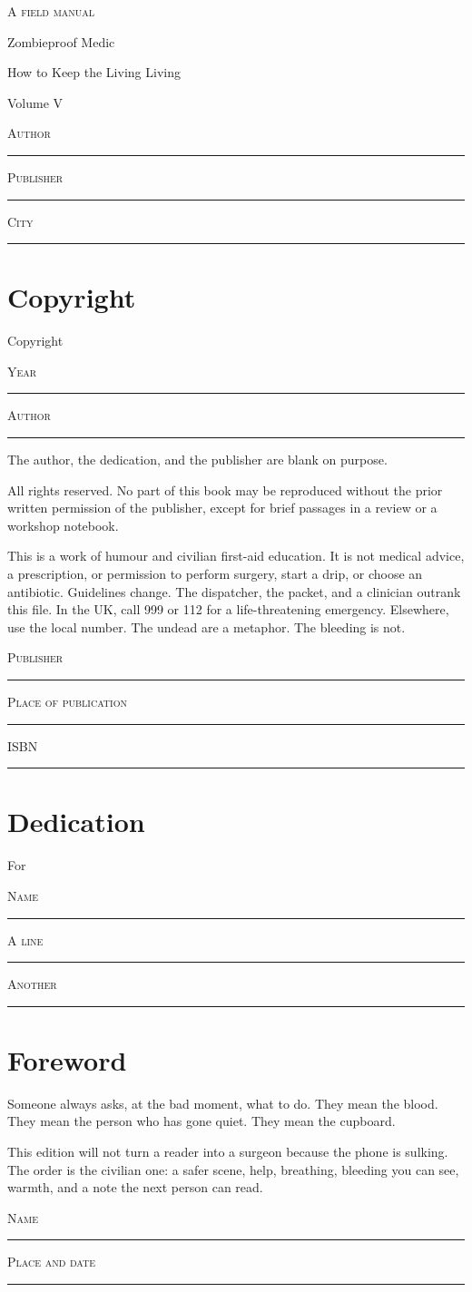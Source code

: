 \documentclass[10pt,openright]{book}
\newcommand{\blankline}[1]{%
  \par\medskip
  {\small\scshape #1}\par\noindent
  \rule{0.8\textwidth}{0.4pt}\par\smallskip
}
\begin{document}
\frontmatter
\begin{titlepage}
\begin{center}
{\small\scshape A field manual\par}
\vspace{1.5em}
{\LARGE Zombieproof Medic\par}
\vspace{0.7em}
{\large How to Keep the Living Living\par}
\vspace{2em}
Volume V
\end{center}
\blankline{Author}
\blankline{Publisher}
\blankline{City}
\end{titlepage}
\chapter*{Copyright}
Copyright \textcopyright{}
\blankline{Year}
\blankline{Author}
The author, the dedication, and the publisher are blank on purpose.

All rights reserved. No part of this book may be reproduced without the prior written permission of the publisher, except for brief passages in a review or a workshop notebook.

This is a work of humour and civilian first-aid education. It is not medical advice, a prescription, or permission to perform surgery, start a drip, or choose an antibiotic. Guidelines change. The dispatcher, the packet, and a clinician outrank this file. In the UK, call 999 or 112 for a life-threatening emergency. Elsewhere, use the local number. The undead are a metaphor. The bleeding is not.
\blankline{Publisher}
\blankline{Place of publication}
\blankline{ISBN}
\chapter*{Dedication}
For
\blankline{Name}
\blankline{A line}
\blankline{Another}
\chapter*{Foreword}
Someone always asks, at the bad moment, what to do. They mean the blood. They mean the person who has gone quiet. They mean the cupboard.

This edition will not turn a reader into a surgeon because the phone is sulking. The order is the civilian one: a safer scene, help, breathing, bleeding you can see, warmth, and a note the next person can read.
\blankline{Name}
\blankline{Place and date}
\mainmatter
\end{document}
